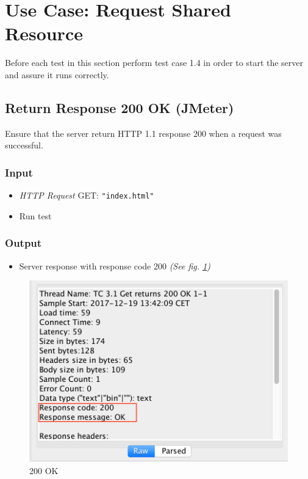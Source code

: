 \documentclass[a4paper, 12pt]{article}
\begin{document}
\newpage
\section{Use Case: Request Shared Resource}

Before each test in this section perform test case 1.4 in order to start the server and assure it runs correctly.

\subsection{Return Response 200 OK (JMeter)}

Ensure that the server return HTTP 1.1 response 200 when a request was successful.

\subsubsection{Input}
\begin{itemize}
\item \textit{HTTP Request} GET: \texttt{"index.html"}
\item Run test
\end{itemize}

\subsubsection{Output}
\begin{itemize}
\item Server response with response code 200 \textit{(See fig. \ref{TC3.1})}
\end{itemize}

\begin{figure}[H]
\centering
\includegraphics[scale=0.7]{output_clarification/200OK.png} 
\caption{200 OK}
\label{TC3.1}
\end{figure}
\end{document}
